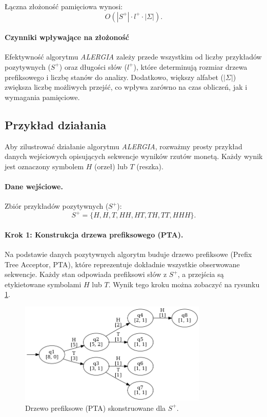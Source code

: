 Łączna złożoność pamięciowa wynosi:  
\[
O(|S^+| \cdot l^+ \cdot |\Sigma|).
\]  

\paragraph*{Czynniki wpływające na złożoność}  
Efektywność algorytmu \textit{ALERGIA} zależy przede wszystkim od liczby przykładów pozytywnych (\( S^+ \)) oraz długości słów (\( l^+ \)), które determinują rozmiar drzewa prefiksowego i liczbę stanów do analizy. Dodatkowo, większy alfabet (\( |\Sigma| \)) zwiększa liczbę możliwych przejść, co wpływa zarówno na czas obliczeń, jak i wymagania pamięciowe.

\subsection{Przykład działania}  
Aby zilustrować działanie algorytmu \textit{ALERGIA}, rozważmy prosty przykład danych wejściowych opisujących sekwencje wyników rzutów monetą. Każdy wynik jest oznaczony symbolem \( H \) (orzeł) lub \( T \) (reszka).

\paragraph*{Dane wejściowe.}  
Zbiór przykładów pozytywnych (\( S^+ \)):  
\[
S^+ = \{H, H, T, HH, HT, TH, TT, HHH\}.
\]  

\paragraph*{Krok 1: Konstrukcja drzewa prefiksowego (PTA).}  
Na podstawie danych pozytywnych algorytm buduje drzewo prefiksowe (Prefix Tree Acceptor, PTA), które reprezentuje dokładnie wszystkie obserwowane sekwencje. Każdy stan odpowiada prefiksowi słów z \( S^+ \), a przejścia są etykietowane symbolami \( H \) lub \( T \). Wynik tego kroku można zobaczyć na rysunku \ref{fig:alergia_example_0}. 

\begin{figure}[ht]
    \centering
    \includegraphics[width=0.8\textwidth]{images/run_example/alergia/0.png}
    \caption{Drzewo prefiksowe (PTA) skonstruowane dla \( S^+ \).}
    \label{fig:alergia_example_0}
\end{figure}

